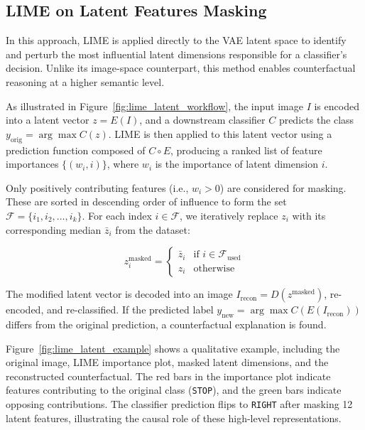 \subsection{LIME on Latent Features Masking}
\label{sec:lime_on_latent}

In this approach, LIME is applied directly to the VAE latent space to identify and perturb the most influential latent dimensions responsible for a classifier’s decision. Unlike its image-space counterpart, this method enables counterfactual reasoning at a higher semantic level.

As illustrated in Figure~\ref{fig:lime_latent_workflow}, the input image \( I \) is encoded into a latent vector \( z = E(I) \), and a downstream classifier \( C \) predicts the class \( y_{\text{orig}} = \arg\max C(z) \). LIME is then applied to this latent vector using a prediction function composed of \( C \circ E \), producing a ranked list of feature importances \( \{(w_i, i)\} \), where \( w_i \) is the importance of latent dimension \( i \).

Only positively contributing features (i.e., \( w_i > 0 \)) are considered for masking. These are sorted in descending order of influence to form the set \( \mathcal{F} = \{i_1, i_2, \ldots, i_k\} \). For each index \( i \in \mathcal{F} \), we iteratively replace \( z_i \) with its corresponding median \( \bar{z}_i \) from the dataset:

\[
z_i^{\text{masked}} =
\begin{cases}
\bar{z}_i & \text{if } i \in \mathcal{F}_{\text{used}} \\
z_i & \text{otherwise}
\end{cases}
\]

The modified latent vector is decoded into an image \( I_{\text{recon}} = D(z^{\text{masked}}) \), re-encoded, and re-classified. If the predicted label \( y_{\text{new}} = \arg\max C(E(I_{\text{recon}})) \) differs from the original prediction, a counterfactual explanation is found.

Figure~\ref{fig:lime_latent_example} shows a qualitative example, including the original image, LIME importance plot, masked latent dimensions, and the reconstructed counterfactual. The red bars in the importance plot indicate features contributing to the original class (\texttt{STOP}), and the green bars indicate opposing contributions. The classifier prediction flips to \texttt{RIGHT} after masking 12 latent features, illustrating the causal role of these high-level representations.

